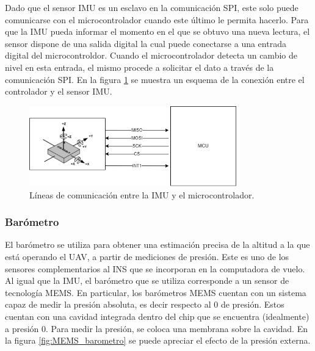 Dado que el sensor IMU es un esclavo en la comunicación SPI, este solo puede comunicarse con el microcontrolador cuando este último le permita hacerlo. Para que la IMU pueda informar el momento en el que se obtuvo una nueva lectura, el sensor dispone de una salida digital la cual puede conectarse a una entrada digital del microcontroldor. Cuando el microcontrolador detecta un cambio de nivel en esta entrada, el mismo procede a solicitar el dato a través de la comunicación SPI. En la figura \ref{fig:IMU_SPI} se muestra un esquema de la conexión entre el controlador y el sensor IMU.

\begin{figure}[htb]
    \centering
    \includegraphics[width=0.8\textwidth]{img/IMU_SPI.png}
    \caption{Líneas de comunicación entre la IMU y el microcontrolador.}
    \label{fig:IMU_SPI}    
\end{figure}

\subsubsection{Barómetro}

El barómetro se utiliza para obtener una estimación precisa de la altitud a la que está operando el UAV, a partir de mediciones de presión. Este es uno de los sensores complementarios al INS que se incorporan en la computadora de vuelo. Al igual que la IMU, el barómetro que se utiliza corresponde a un sensor de tecnología MEMS. En particular, los barómetros MEMS cuentan con un sistema capaz de medir la presión absoluta, es decir respecto al 0 de presión. Estos cuentan con una cavidad integrada dentro del chip que se encuentra (idealmente) a presión 0. %
Para medir la presión, se coloca una membrana sobre la cavidad. En la figura \ref{fig:MEMS_barometro} se puede apreciar el efecto de la presión externa. 


